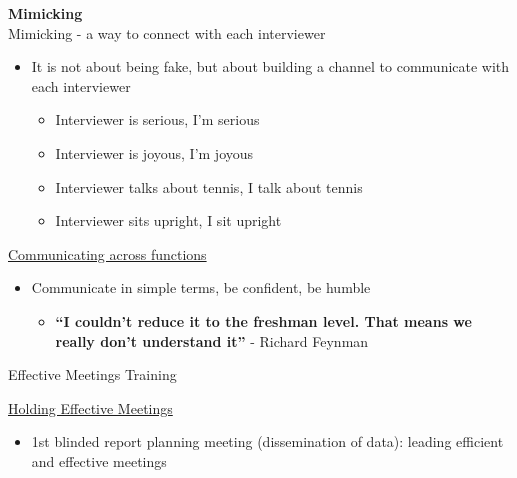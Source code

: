 \documentclass{beamer}
\begin{document}
\begin{frame}
	\center
	\textbf{Mimicking}\\
	\pause
	Mimicking - a way to connect with each interviewer
	\pause
	\begin{itemize}
	\item \alert{It is not about being fake, but about building a channel to
		communicate with each interviewer}
		\pause
			\begin{itemize}
			\item Interviewer is serious, I’m serious
			\pause
			\item Interviewer is joyous, I’m joyous
			\pause
			\item Interviewer talks about tennis, I talk about tennis
			\pause
			\item Interviewer sits upright, I sit upright	
			\end{itemize}
	\end{itemize}
\end{frame}

\begin{frame}
	\center
	\underline{Communicating across functions}\\
	\vspace{15pt} 
	\begin{itemize}
		\item Communicate in simple terms, be confident, be humble
		\begin{itemize}	
		\item \textbf {“I couldn’t reduce it to the freshman level. That means
		we really don’t understand it”} - Richard Feynman
		\end{itemize}
	\end{itemize}
\end{frame}

\begin{frame}
	\center
	Effective Meetings Training
\end{frame}

\begin{frame}
	\center
	\underline{Holding Effective Meetings}\\
	\vspace{15pt} 
	\begin{itemize}
		\item 1st blinded report planning meeting (dissemination of data):
		leading efficient and effective meetings
	\end{itemize}
\end{frame}	
\end{document}
